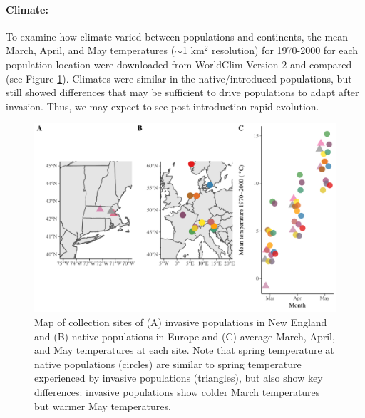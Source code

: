 \documentclass[12pt]{article}\usepackage[]{graphicx}\usepackage[]{color}
\begin{document}
	\paragraph{Climate:} 
	To examine how climate varied between populations and continents, the mean March, April, and May temperatures ($\sim$1 km$^2$ resolution) for 1970-2000 for each population location were downloaded from WorldClim Version 2 \parencite{Fick2017}  and compared (see Figure \ref{fig:sites}). Climates were similar in the native/introduced populations, but still showed differences that may be sufficient to drive populations to adapt after invasion. Thus, we may expect to see post-introduction rapid evolution.
	
	
	\begin{figure} 
		\centering
		\includegraphics[width=1 \textwidth,trim=0cm 0cm 0cm 0cm, angle=0, scale=.9, origin=c,clip=false]{sampling_sites}
		\caption{Map of collection sites of (A) invasive populations in New England and (B) native populations in Europe and (C) average March, April, and May temperatures at each site. Note that spring temperature at native populations (circles) are similar to spring temperature experienced by invasive populations (triangles), but also show key differences: invasive populations show colder March temperatures but warmer May temperatures. } %
		\label{fig:sites}
	\end{figure}
\end{document}
